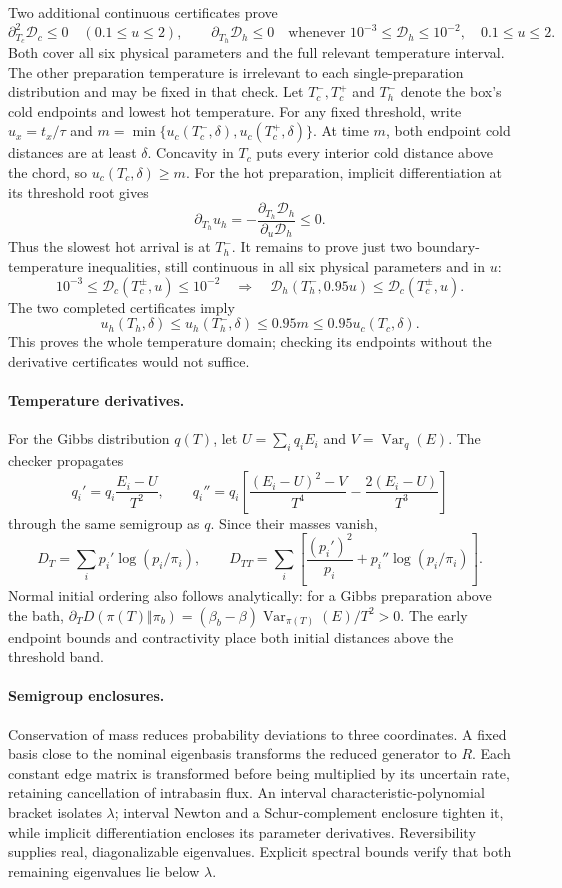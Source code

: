 \documentclass[11pt]{article}
\begin{document}
Two additional continuous certificates prove
\[
 \partial_{T_c}^2\mathcal D_c\leq0
 \quad(0.1\leq u\leq2),\qquad
 \partial_{T_h}\mathcal D_h\leq0
 \quad\text{whenever }10^{-3}\leq\mathcal D_h\leq10^{-2},
 \quad0.1\leq u\leq2.
\]
Both cover all six physical parameters and the full relevant temperature
interval. The other preparation temperature is irrelevant to each
single-preparation distribution and may be fixed in that check.
Let $T_c^-,T_c^+$ and $T_h^-$ denote the box's cold endpoints and lowest
hot temperature. For any fixed threshold, write $u_x=t_x/\tau$ and
$m=\min\{u_c(T_c^-,\delta),u_c(T_c^+,\delta)\}$.
At time $m$, both endpoint cold distances are at least $\delta$.
Concavity in $T_c$ puts every interior cold distance above the chord,
so $u_c(T_c,\delta)\geq m$. For the hot preparation, implicit
 differentiation at its threshold root gives
\[
 \partial_{T_h}u_h=-\frac{\partial_{T_h}\mathcal D_h}
                              {\partial_u\mathcal D_h}\leq0.
\]
Thus the slowest hot arrival is at $T_h^-$. It remains to prove just two
boundary-temperature inequalities, still continuous in all six physical
parameters and in $u$:
\[
 10^{-3}\leq\mathcal D_c(T_c^\pm,u)\leq10^{-2}
 \quad\Longrightarrow\quad
 \mathcal D_h(T_h^-,0.95u)\leq\mathcal D_c(T_c^\pm,u).
\]
The two completed certificates imply
\[
 u_h(T_h,\delta)\leq u_h(T_h^-,\delta)
 \leq0.95m\leq0.95u_c(T_c,\delta).
\]
This proves the whole temperature domain; checking its endpoints without
the derivative certificates would not suffice.

\paragraph{Temperature derivatives.}
For the Gibbs distribution $q(T)$, let $U=\sum_iq_iE_i$ and
$V=\operatorname{Var}_q(E)$. The checker propagates
\[
 q_i'=q_i\frac{E_i-U}{T^2},\qquad
 q_i''=q_i\left[\frac{(E_i-U)^2-V}{T^4}
                      -\frac{2(E_i-U)}{T^3}\right]
\]
through the same semigroup as $q$. Since their masses vanish,
\[
 D_T=\sum_i p_i'\log(p_i/\pi_i),\qquad
 D_{TT}=\sum_i\left[\frac{(p_i')^2}{p_i}
                         +p_i''\log(p_i/\pi_i)\right].
\]
Normal initial ordering also follows analytically: for a Gibbs preparation
above the bath, $\partial_T D(\pi(T)\Vert\pi_b)
=(\beta_b-\beta)\operatorname{Var}_{\pi(T)}(E)/T^2>0$.
The early endpoint bounds and contractivity place both initial distances
above the threshold band.

\paragraph{Semigroup enclosures.}
Conservation of mass reduces probability deviations to three coordinates.
A fixed basis close to the nominal eigenbasis transforms the reduced
generator to $R$. Each constant edge matrix is transformed before being
multiplied by its uncertain rate, retaining cancellation of intrabasin
flux. An interval characteristic-polynomial bracket isolates $\lambda$;
interval Newton and a Schur-complement enclosure tighten it, while
implicit differentiation encloses its parameter derivatives.
Reversibility supplies real, diagonalizable eigenvalues. Explicit
spectral bounds verify that both remaining eigenvalues lie below $\lambda$.
\end{document}
